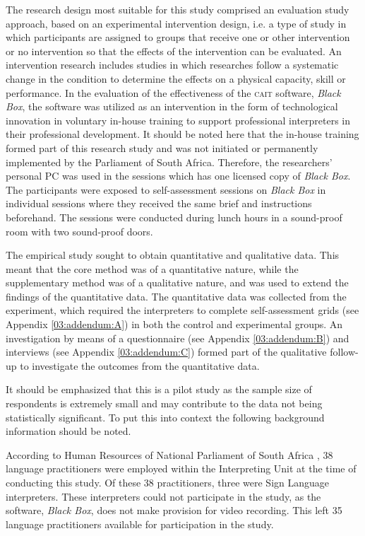 \documentclass[output=paper]{langsci/langscibook}
\begin{document}
The research design most suitable for this study comprised an evaluation study approach, based on an experimental intervention design, i.e. a type of study in which participants are assigned to groups that receive one or other intervention or no intervention so that the effects of the intervention can be evaluated. An intervention research includes studies in which researches follow a systematic change in the condition to determine the effects on a physical capacity, skill or performance. In the evaluation of the effectiveness of the \textsc{cait} software, \textit{Black Box}, the software was utilized as an intervention in the form of technological innovation in voluntary in-house training to support professional interpreters in their professional development. It should be noted here that the in-house training formed part of this research study and was not initiated or permanently implemented by the Parliament of South Africa. Therefore, the researchers’ personal PC was used in the sessions which has one licensed copy of \textit{Black Box}. The participants were exposed to self-assessment sessions on \textit{Black Box} in individual sessions where they received the same brief and instructions beforehand. The sessions were conducted during lunch hours in a sound-proof room with two sound-proof doors. 

The empirical study sought to obtain quantitative and qualitative data. This meant that the core method was of a quantitative nature, while the supplementary method was of a qualitative nature, and was used to extend the findings of the quantitative data. The quantitative data was collected from the experiment, which required the interpreters to complete self-assessment grids (see Appendix \ref{03:addendum:A})
in both the control and experimental groups. An investigation by means of a questionnaire (see Appendix \ref{03:addendum:B}) and interviews (see Appendix \ref{03:addendum:C}) formed part of the qualitative follow-up to investigate the outcomes from the quantitative data.

It should be emphasized that this is a pilot study as the sample size of respondents is extremely small and may contribute to the data not being statistically significant. To put this into context the following background information should be noted. 

According to Human Resources of National Parliament of South Africa \citep{Moorad2017}, 38 language practitioners were employed within the Interpreting Unit at the time of conducting this study. Of these 38 practitioners, three were Sign Language interpreters. These interpreters could not participate in the study, as the software, \textit{Black Box}, does not make provision for video recording. This left 35 language practitioners available for participation in the study. 
\end{document}
